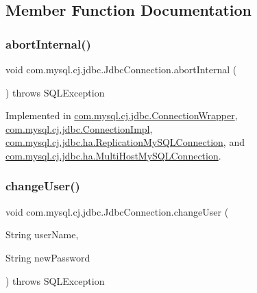 \subsection{Member Function Documentation}
\mbox{\label{interfacecom_1_1mysql_1_1cj_1_1jdbc_1_1_jdbc_connection_afc07faaedcdfc3be9fa9bfcf751b673a}} 
\subsubsection{\texorpdfstring{abort\+Internal()}{abortInternal()}}
{\footnotesize\ttfamily void com.\+mysql.\+cj.\+jdbc.\+Jdbc\+Connection.\+abort\+Internal (\begin{DoxyParamCaption}{ }\end{DoxyParamCaption}) throws S\+Q\+L\+Exception}



Implemented in \mbox{\hyperlink{classcom_1_1mysql_1_1cj_1_1jdbc_1_1_connection_wrapper_a215a9344c2e91576f7df2df642111b50}{com.\+mysql.\+cj.\+jdbc.\+Connection\+Wrapper}}, \mbox{\hyperlink{classcom_1_1mysql_1_1cj_1_1jdbc_1_1_connection_impl_a39a1f63273b1ccd8e4baf30f1f6955a9}{com.\+mysql.\+cj.\+jdbc.\+Connection\+Impl}}, \mbox{\hyperlink{classcom_1_1mysql_1_1cj_1_1jdbc_1_1ha_1_1_replication_my_s_q_l_connection_a10917e3985284c676e558743b04a4adc}{com.\+mysql.\+cj.\+jdbc.\+ha.\+Replication\+My\+S\+Q\+L\+Connection}}, and \mbox{\hyperlink{classcom_1_1mysql_1_1cj_1_1jdbc_1_1ha_1_1_multi_host_my_s_q_l_connection_a1f78b90c599fa58090713a8fd1303d2a}{com.\+mysql.\+cj.\+jdbc.\+ha.\+Multi\+Host\+My\+S\+Q\+L\+Connection}}.

\mbox{\label{interfacecom_1_1mysql_1_1cj_1_1jdbc_1_1_jdbc_connection_aed0496e0f2c1236f2784f92b45a482ef}} 
\subsubsection{\texorpdfstring{change\+User()}{changeUser()}}
{\footnotesize\ttfamily void com.\+mysql.\+cj.\+jdbc.\+Jdbc\+Connection.\+change\+User (\begin{DoxyParamCaption}\item[{String}]{user\+Name,  }\item[{String}]{new\+Password }\end{DoxyParamCaption}) throws S\+Q\+L\+Exception}

